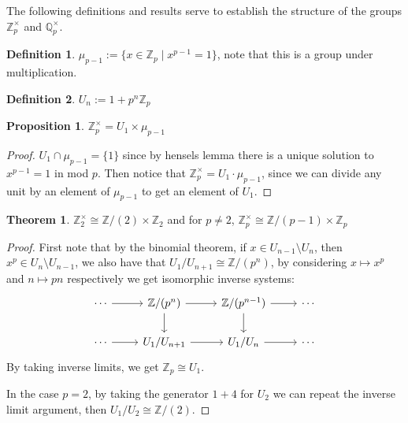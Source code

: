 \documentclass[11pt]{article}
\theoremstyle{definition}
\newtheorem{defn}{Definition}
\newtheorem{thm}{Theorem}
\newtheorem{prop}{Proposition}
\newcommand{\set}[1]{\{#1\}}
\begin{document}
    The following definitions and results serve to establish the structure of the groups \(\mathbb{Z}_p^\times\) and \(\mathbb{Q}_p^\times\).
    \begin{defn}
        \(\mu_{p-1} := \set{x \in \mathbb{Z}_p \mid x^{p-1} = 1}\), note that this is a group under multiplication.
    \end{defn}
    \begin{defn}
        \(U_n := 1 + p^n \mathbb{Z}_p\)
    \end{defn}
    \begin{prop}
        \(\mathbb{Z}_p^\times = U_1 \times \mu_{p-1}\)
        \begin{proof}
            \(U_1 \cap \mu_{p-1} = \set{1}\) since by hensels lemma there is a unique solution to \(x^{p-1} = 1\) in mod \(p\). Then notice that \(\mathbb{Z}_p^\times = U_1\cdot \mu_{p-1}\), since we can divide any unit by an element of \(\mu_{p-1}\) to get an element of \(U_1\).
        \end{proof}
    \end{prop}
    \begin{thm}
        \(\mathbb{Z}_2^\times \cong \mathbb{Z}/(2) \times \mathbb{Z}_2\) and for \(p \neq 2\), \(\mathbb{Z}_p^\times \cong \mathbb{Z}/(p-1)\times \mathbb{Z}_p\)
        \begin{proof}
            First note that by the binomial theorem, if \(x \in U_{n-1} \setminus U_n\), then \(x^p \in U_n \setminus U_{n-1}\), we also have that \(U_1/U_{n+1} \cong \mathbb{Z}/(p^n)\), by considering \(x \mapsto x^p\) and \(n \mapsto pn\) respectively we get isomorphic inverse systems:
            \begin{equation*}
                \begin{tikzcd}
                    \cdots \arrow[r,"{}"] & \mathbb{Z}/(p^n) \arrow[r,"{}"] \arrow[d,"{}"] &\mathbb{Z}/(p^{n-1}) \arrow[r,"{}"] \arrow[d,"{}"]&\cdots \\
                    \cdots \arrow[r,"{}"] &U_1/U_{n+1} \arrow[r,"{}"] &U_1/U_n \arrow[r,"{}"] &\cdots
                \end{tikzcd}
            \end{equation*}
            By taking inverse limits, we get \(\mathbb{Z}_p \cong U_1\).

            In the case \(p = 2\), by taking the generator \(1 + 4\) for \(U_2\) we can repeat the inverse limit argument, then \(U_1/U_2 \cong \mathbb{Z}/(2)\).
        \end{proof}
    \end{thm}
\end{document}
